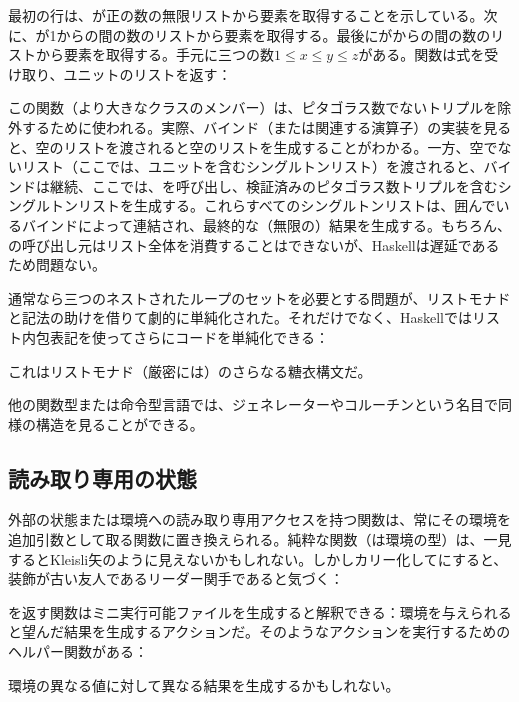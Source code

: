 最初の行は、が正の数の無限リスト\code{{[}1..{]}}から要素を取得することを示している。次に、が1からの間の数のリスト\code{{[}1..z{]}}から要素を取得する。最後にがからの間の数のリストから要素を取得する。手元に三つの数$1 \leqslant x \leqslant y \leqslant z$がある。関数は式を受け取り、ユニットのリストを返す：

この関数（より大きなクラスのメンバー）は、ピタゴラス数でないトリプルを除外するために使われる。実際、バインド（または関連する演算子\code{>>}）の実装を見ると、空のリストを渡されると空のリストを生成することがわかる。一方、空でないリスト（ここでは、ユニット\code{{[}(){]}}を含むシングルトンリスト）を渡されると、バインドは継続、ここでは、を呼び出し、検証済みのピタゴラス数トリプルを含むシングルトンリストを生成する。これらすべてのシングルトンリストは、囲んでいるバインドによって連結され、最終的な（無限の）結果を生成する。もちろん、の呼び出し元はリスト全体を消費することはできないが、Haskellは遅延であるため問題ない。

通常なら三つのネストされたループのセットを必要とする問題が、リストモナドと記法の助けを借りて劇的に単純化された。それだけでなく、Haskellではリスト内包表記を使ってさらにコードを単純化できる：

これはリストモナド（厳密には）のさらなる糖衣構文だ。

他の関数型または命令型言語では、ジェネレーターやコルーチンという名目で同様の構造を見ることができる。

\subsection{読み取り専用の状態}

外部の状態または環境への読み取り専用アクセスを持つ関数は、常にその環境を追加引数として取る関数に置き換えられる。純粋な関数（は環境の型）は、一見するとKleisli矢のように見えないかもしれない。しかしカリー化してにすると、装飾が古い友人であるリーダー関手であると気づく：

を返す関数はミニ実行可能ファイルを生成すると解釈できる：環境を与えられると望んだ結果を生成するアクションだ。そのようなアクションを実行するためのヘルパー関数がある：

環境の異なる値に対して異なる結果を生成するかもしれない。

